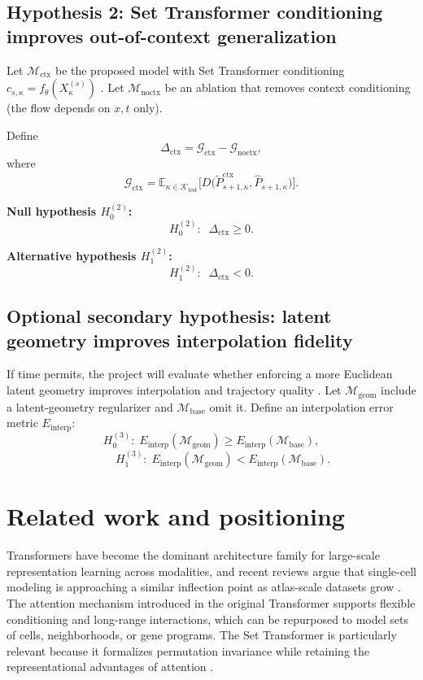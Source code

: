\documentclass[conference]{IEEEtran}
\newcommand{\E}{\mathbb{E}}
\begin{document}
\subsection{Hypothesis 2: Set Transformer conditioning improves out-of-context generalization}

Let $\mathcal{M}_{\text{ctx}}$ be the proposed model with Set Transformer conditioning $c_{s,\kappa}=f_{\theta}(X^{(s)}_{\kappa})$ \cite{Lee2018-ya}. Let $\mathcal{M}_{\text{noctx}}$ be an ablation that removes context conditioning (the flow depends on $x,t$ only).

Define
\[
\Delta_{\text{ctx}}
=
\mathcal{G}_{\text{ctx}} - \mathcal{G}_{\text{noctx}},
\]
where
\[
\mathcal{G}_{\text{ctx}}
=
\E_{\kappa \in \mathcal{K}_{\text{test}}}
\Big[
D\big(\tilde{P}^{\text{ctx}}_{s+1,\kappa}, \hat{P}_{s+1,\kappa}\big)
\Big].
\]

\textbf{Null hypothesis $H_0^{(2)}$:}
\[
H_0^{(2)}:\;\; \Delta_{\text{ctx}} \ge 0.
\]

\textbf{Alternative hypothesis $H_1^{(2)}$:}
\[
H_1^{(2)}:\;\; \Delta_{\text{ctx}} < 0.
\]

\subsection{Optional secondary hypothesis: latent geometry improves interpolation fidelity}

If time permits, the project will evaluate whether enforcing a more Euclidean latent geometry improves interpolation and trajectory quality \cite{Palma2025-uk}. Let $\mathcal{M}_{\text{geom}}$ include a latent-geometry regularizer and $\mathcal{M}_{\text{base}}$ omit it. Define an interpolation error metric $E_{\text{interp}}$:
\[
H_0^{(3)}:\; E_{\text{interp}}(\mathcal{M}_{\text{geom}}) \ge E_{\text{interp}}(\mathcal{M}_{\text{base}}),
\]
\[
\qquad
H_1^{(3)}:\; E_{\text{interp}}(\mathcal{M}_{\text{geom}}) < E_{\text{interp}}(\mathcal{M}_{\text{base}}).
\]

\section{Related work and positioning}

Transformers have become the dominant architecture family for large-scale representation learning across modalities, and recent reviews argue that single-cell modeling is approaching a similar inflection point as atlas-scale datasets grow \cite{Szalata2024-jl}. The attention mechanism introduced in the original Transformer \cite{Vaswani2017-rb} supports flexible conditioning and long-range interactions, which can be repurposed to model sets of cells, neighborhoods, or gene programs. The Set Transformer is particularly relevant because it formalizes permutation invariance while retaining the representational advantages of attention \cite{Lee2018-ya}.
\end{document}
